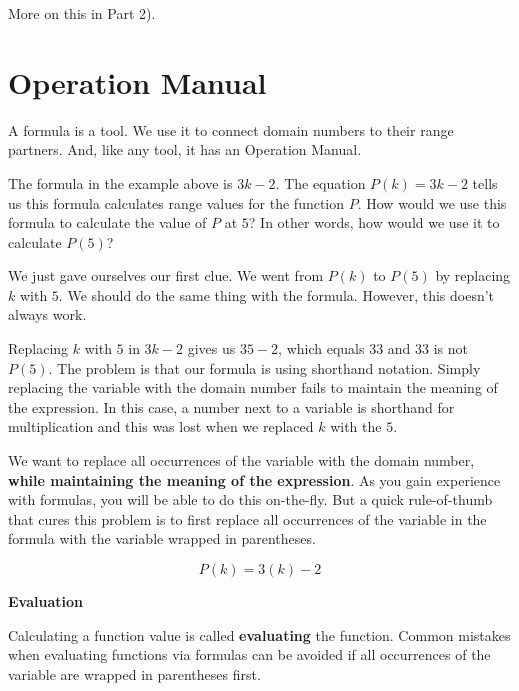 \documentclass{ximera}
\begin{document}
More on this in Part 2). \\




\section*{Operation Manual}

A formula is a tool.  We use it to connect domain numbers to their range partners.  And, like any tool, it has an Operation Manual.



The formula in the example above is $3k - 2$.  The equation $P(k) = 3k - 2$ tells us this formula calculates range values for the function $P$.  How would we use this formula to calculate the value of $P$ at $5$?   In other words, how would we use it to calculate $P(5)$?

We just gave ourselves our first clue. We went from $P(k)$ to $P(5)$ by replacing $k$ with $5$.  We should do the same thing with the formula. However, this doesn't always work.






Replacing $k$ with $5$ in $3k - 2$ gives us $35-2$, which equals $33$ and $33$ is not $P(5)$. The problem is that our formula is using shorthand notation. Simply replacing the variable with the domain number fails to maintain the meaning of the expression.  In this case, a number next to a variable is shorthand for multiplication and this was lost when we replaced $k$ with the $5$.

We want to replace all occurrences of the variable with the domain number, \textbf{\textcolor{purple!85!blue}{while maintaining the meaning of the expression}}.  As you gain experience with formulas, you will be able to do this on-the-fly.  But a quick rule-of-thumb that cures this problem is to first replace all occurrences of the variable in the formula with the variable wrapped in parentheses.



\[  P(k) = 3(k) - 2  \]


\begin{procedure} \textbf{\textcolor{purple!85!blue}{Evaluation}}   

Calculating a function value is called \textbf{evaluating} the function.  Common mistakes when evaluating functions via formulas can be avoided if all occurrences of the variable are wrapped in parentheses first.
\end{procedure}
\end{document}
